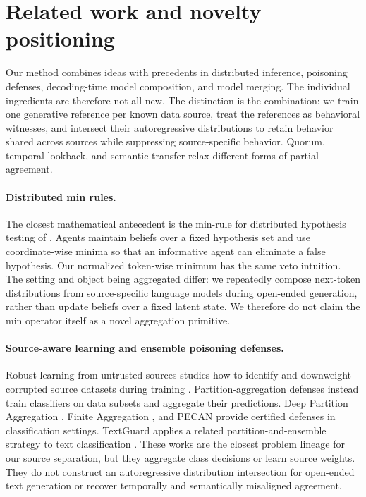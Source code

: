 \documentclass{article}
\begin{document}
\clearpage
\section{Related work and novelty positioning}
\label{app:related-work}

Our method combines ideas with precedents in distributed inference, poisoning
defenses, decoding-time model composition, and model merging. The individual
ingredients are therefore not all new. The distinction is the combination:
we train one generative reference per known data source, treat the references
as behavioral witnesses, and intersect their autoregressive distributions to
retain behavior shared across sources while suppressing source-specific
behavior. Quorum, temporal lookback, and semantic transfer relax different
forms of partial agreement.

\paragraph{Distributed min rules.}
The closest mathematical antecedent is the min-rule for distributed
hypothesis testing of \citet{mitra2019minrule}. Agents maintain beliefs over a
fixed hypothesis set and use coordinate-wise minima so that an informative
agent can eliminate a false hypothesis. Our normalized token-wise minimum has
the same veto intuition. The setting and object being aggregated differ:
we repeatedly compose next-token distributions from source-specific language
models during open-ended generation, rather than update beliefs over a fixed
latent state. We therefore do not claim the min operator itself as a novel
aggregation primitive.

\paragraph{Source-aware learning and ensemble poisoning defenses.}
Robust learning from untrusted sources studies how to identify and downweight
corrupted source datasets during training \citep{konstantinov2019untrusted}.
Partition-aggregation defenses instead train classifiers on data subsets and
aggregate their predictions. Deep Partition Aggregation
\citep{levine2020dpa}, Finite Aggregation \citep{wang2022finite}, and PECAN
\citep{zhang2023pecan} provide certified defenses in classification settings.
TextGuard applies a related partition-and-ensemble strategy to text
classification \citep{pei2023textguard}. These works are the closest problem
lineage for our source separation, but they aggregate class decisions or
learn source weights. They do not construct an autoregressive distribution
intersection for open-ended text generation or recover temporally and
semantically misaligned agreement.
\end{document}

